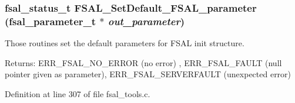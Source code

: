 \subsubsection[{FSAL\_\-SetDefault\_\-FSAL\_\-parameter}]{\setlength{\rightskip}{0pt plus 5cm}fsal\_\-status\_\-t FSAL\_\-SetDefault\_\-FSAL\_\-parameter (fsal\_\-parameter\_\-t $\ast$ {\em out\_\-parameter})}\label{fsal__tools_8c_a4c8e7706d68c7f776c02726c89dc8d0}


Those routines set the default parameters for FSAL init structure. \begin{Desc}
\item[Returns:]ERR\_\-FSAL\_\-NO\_\-ERROR (no error) , ERR\_\-FSAL\_\-FAULT (null pointer given as parameter), ERR\_\-FSAL\_\-SERVERFAULT (unexpected error) \end{Desc}


Definition at line 307 of file fsal\_\-tools.c.